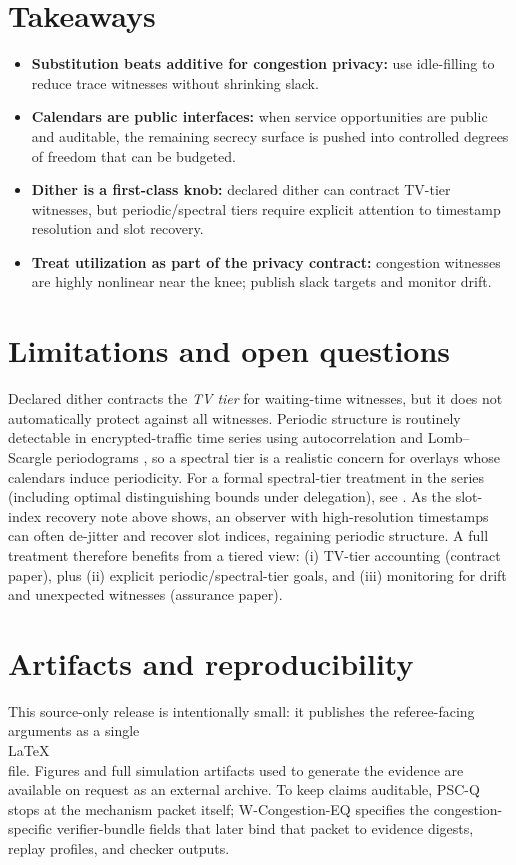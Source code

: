 \documentclass[11pt]{article}
\theoremstyle{definition}
\theoremstyle{remark}
\begin{document}
\section{Takeaways}
\begin{itemize}[leftmargin=*]
\item \textbf{Substitution beats additive for congestion privacy:} use idle-filling to reduce trace witnesses without shrinking slack.
\item \textbf{Calendars are public interfaces:} when service opportunities are public and auditable, the remaining secrecy surface is pushed into controlled degrees of freedom that can be budgeted.
\item \textbf{Dither is a first-class knob:} declared dither can contract TV-tier witnesses, but periodic/spectral tiers require explicit attention to timestamp resolution and slot recovery.
\item \textbf{Treat utilization as part of the privacy contract:} congestion witnesses are highly nonlinear near the knee; publish slack targets and monitor drift.
\end{itemize}

\section{Limitations and open questions}
Declared dither contracts the \emph{TV tier} for waiting-time witnesses, but it does not automatically protect against all witnesses.
Periodic structure is routinely detectable in encrypted-traffic time series using autocorrelation and Lomb--Scargle periodograms \cite{lomb1976,scargle1982,koumar2022periodic,assadhan2014,periodicity2025}, so a spectral tier is a realistic concern for overlays whose calendars induce periodicity. For a formal spectral-tier treatment in the series (including optimal distinguishing bounds under delegation), see \cite{series:spectral}.
As the slot-index recovery note above shows, an observer with high-resolution timestamps can often de-jitter and recover slot indices, regaining periodic structure.
A full treatment therefore benefits from a tiered view: (i) TV-tier accounting (contract paper), plus (ii) explicit periodic/spectral-tier goals, and (iii) monitoring for drift and unexpected witnesses (assurance paper).


\section{Artifacts and reproducibility}
This source-only release is intentionally small: it publishes the referee-facing arguments as a single \\LaTeX\\ file.
Figures and full simulation artifacts used to generate the evidence are available on request as an external archive.
To keep claims auditable, PSC-Q stops at the mechanism packet itself; W-Congestion-EQ specifies the congestion-specific verifier-bundle fields that later bind that packet to evidence digests, replay profiles, and checker outputs.
\end{document}
